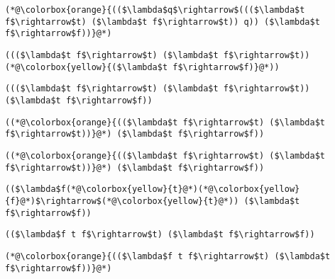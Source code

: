 \documentclass{beamer}
\begin{document}
\begin{frame}[fragile]{\CurrentSection}
\lstset{basicstyle=\ttfamily\small}\lstset{numbers=none}\lstset{language=ML}\begin{lstlisting}
(*@\colorbox{orange}{(($\lambda$q$\rightarrow$((($\lambda$t f$\rightarrow$t) ($\lambda$t f$\rightarrow$t)) q)) ($\lambda$t f$\rightarrow$f))}@*)
\end{lstlisting}
\pause\lstset{language=ML}\begin{lstlisting}
((($\lambda$t f$\rightarrow$t) ($\lambda$t f$\rightarrow$t)) (*@\colorbox{yellow}{($\lambda$t f$\rightarrow$f)}@*))
\end{lstlisting}

\end{frame}

\begin{frame}[fragile]{\CurrentSection}
\lstset{basicstyle=\ttfamily\small}\lstset{numbers=none}\lstset{language=ML}\begin{lstlisting}
((($\lambda$t f$\rightarrow$t) ($\lambda$t f$\rightarrow$t)) ($\lambda$t f$\rightarrow$f))
\end{lstlisting}
\pause\lstset{language=ML}\begin{lstlisting}
((*@\colorbox{orange}{(($\lambda$t f$\rightarrow$t) ($\lambda$t f$\rightarrow$t))}@*) ($\lambda$t f$\rightarrow$f))
\end{lstlisting}

\end{frame}

\begin{frame}[fragile]{\CurrentSection}
\lstset{basicstyle=\ttfamily\small}\lstset{numbers=none}\lstset{language=ML}\begin{lstlisting}
((*@\colorbox{orange}{(($\lambda$t f$\rightarrow$t) ($\lambda$t f$\rightarrow$t))}@*) ($\lambda$t f$\rightarrow$f))
\end{lstlisting}
\pause\lstset{language=ML}\begin{lstlisting}
(($\lambda$f(*@\colorbox{yellow}{t}@*)(*@\colorbox{yellow}{f}@*)$\rightarrow$(*@\colorbox{yellow}{t}@*)) ($\lambda$t f$\rightarrow$f))
\end{lstlisting}

\end{frame}

\begin{frame}[fragile]{\CurrentSection}
\lstset{basicstyle=\ttfamily\small}\lstset{numbers=none}\lstset{language=ML}\begin{lstlisting}
(($\lambda$f t f$\rightarrow$t) ($\lambda$t f$\rightarrow$f))
\end{lstlisting}
\pause\lstset{language=ML}\begin{lstlisting}
(*@\colorbox{orange}{(($\lambda$f t f$\rightarrow$t) ($\lambda$t f$\rightarrow$f))}@*)
\end{lstlisting}

\end{frame}
\end{document}
